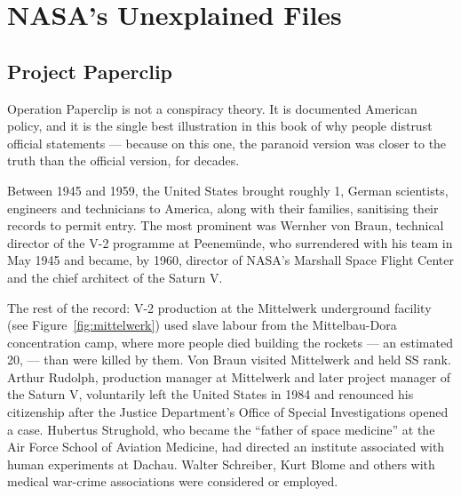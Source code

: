 \chapter{NASA's Unexplained Files}\label{ch:nasa}


\section{Project Paperclip}\label{sec:paperclip}

Operation Paperclip is not a conspiracy theory. It is documented American policy, and it is the
single best illustration in this book of why people distrust official statements --- because on
this one, the paranoid version was closer to the truth than the official version, for decades.

Between 1945 and 1959, the United States brought roughly 1, German scientists, engineers and
technicians to America, along with their families, sanitising their records to permit entry. The
most prominent was Wernher von Braun, technical director of the V-2 programme at Peenem\"unde, who
surrendered with his team in May 1945 and became, by 1960, director of NASA's Marshall Space Flight
Center and the chief architect of the Saturn V.

The rest of the record: V-2 production at the Mittelwerk underground facility (see Figure~\ref{fig:mittelwerk}) used slave labour
from the Mittelbau-Dora concentration camp, where more people died building the rockets --- an
estimated 20, --- than were killed by them. Von Braun visited Mittelwerk and held SS rank.
Arthur Rudolph, production manager at Mittelwerk and later project manager of the Saturn V,
voluntarily left the United States in 1984 and renounced his citizenship after the Justice
Department's Office of Special Investigations opened a case. Hubertus Strughold, who became the
``father of space medicine'' at the Air Force School of Aviation Medicine, had directed an institute
associated with human experiments at Dachau. Walter Schreiber, Kurt Blome and others with medical
war-crime associations were considered or employed.

